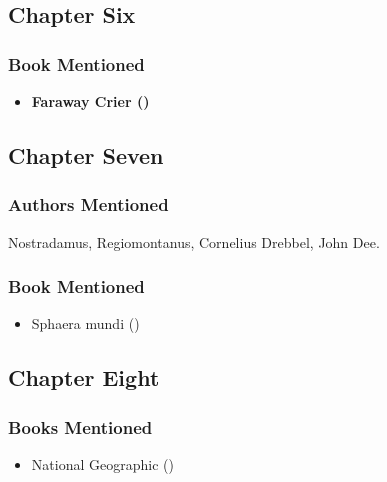 \documentclass[
]{article}
\providecommand{\tightlist}{%
  \setlength{\itemsep}{0pt}\setlength{\parskip}{0pt}}
\begin{document}
\subsection{Chapter Six}\label{chapter-six-2}

\subsubsection{Book Mentioned}\label{book-mentioned}

\begin{itemize}
\tightlist
\item
  \textbf{Faraway Crier ()}
\end{itemize}

\subsection{Chapter Seven}\label{chapter-seven-1}

\subsubsection{Authors Mentioned}\label{authors-mentioned-23}

Nostradamus, Regiomontanus, Cornelius Drebbel, John Dee.

\subsubsection{Book Mentioned}\label{book-mentioned-1}

\begin{itemize}
\tightlist
\item
  Sphaera mundi ()
\end{itemize}

\subsection{Chapter Eight}\label{chapter-eight-2}

\subsubsection{Books Mentioned}\label{books-mentioned-23}

\begin{itemize}
\tightlist
\item
  National Geographic ()
\end{itemize}
\end{document}
